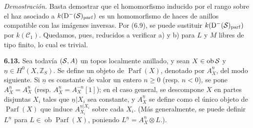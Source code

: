 \providecommand{\Cpx}{\mathrm C}
\providecommand{\Kpx}{\mathrm K}
\providecommand{\Dpx}{\mathrm D}
\providecommand{\Ho}{\mathrm H}
\providecommand{\RHom}{\mathrm R\!\operatorname{Hom}}
\providecommand{\Ob}{\operatorname{ob}}
\providecommand{\Hom}{\operatorname{Hom}}
\providecommand{\RHom}{\mathrm R\!\operatorname{Hom}}
\providecommand{\Ext}{\operatorname{Ext}}
\providecommand{\Tor}{\operatorname{Tor}}
\providecommand{\Tr}{\operatorname{Tr}}
\providecommand{\Add}{\operatorname{Add}}
\providecommand{\Cart}{\operatorname{Cart}}
\providecommand{\Parf}{\operatorname{Parf}}
\providecommand{\coh}{\operatorname{coh}}
\providecommand{\amp}{\operatorname{amp}}
\providecommand{\cl}{\operatorname{cl}}
\providecommand{\rg}{\operatorname{rg}}
\providecommand{\Id}{\operatorname{Id}}
\providecommand{\Ker}{\operatorname{Ker}}
\providecommand{\Im}{\operatorname{Im}}
\providecommand{\cH}{\mathcal H}
\providecommand{\Zs}{\mathbb Z_S}
\providecommand{\A}{\mathcal A}
\providecommand{\cC}{\mathcal C}
\providecommand{\cCzero}{\mathcal C_0}
\providecommand{\otL}{\mathop{\otimes}^{\mathrm L}}
\providecommand{\tamp}{\operatorname{tor.amp}}
\providecommand{\pamp}{\operatorname{parf.amp}}
\providecommand{\pdim}{\operatorname{parf.dim}}
\providecommand{\bon}{\mathrm b}
\providecommand{\parf}{\operatorname{parf}}
\providecommand{\parff}{\operatorname{parf}}
\providecommand{\ac}{\mathrm{ac}}


\providecommand{\End}{\operatorname{End}}
\providecommand{\tr}{\operatorname{tr}}

\emph{Demostración.} Basta demostrar que el homomorfismo inducido por el rango sobre el haz asociado a \(k(\Dpx^-(\sisi{S}{\mathcal S})_{\mathrm{parf}})\) es un homomorfismo de haces de anillos compatible con las imágenes inversas. Por (6.9), se puede sustituir \(k(\Dpx^-(\sisi{S}{\mathcal S})_{\mathrm{parf}})\) por \(k(\mathcal C_1)\). Quedamos, pues, reducidos a verificar a) y b) para \(L\) y \(M\) libres de tipo finito, lo cual es trivial.

\textbf{6.13.} Sea todavía \((\sisi{S}{\mathcal S},A)\) un topos localmente anillado, y sean \(X\in\Ob \sisi{S}{\mathcal S}\) y \(\underline n\in H^0(X,\mathbb Z_S)\). Se define un objeto de \(\Parf(X)\), denotado por \(A_X^{\underline n}\), del modo siguiente. Si \(\underline n\) es constante de valor un entero \(n\geq0\) (resp. \(n<0\)), se pone \(A_X^{\underline n}=A_X^n\) (resp. \(A_X^{\underline n}=A_X^{-n}[1]\)); en el caso general, se descompone \(X\) en partes disjuntas \(X_i\) tales que \(\underline n|X_i\) sea constante, y \(A_X^{\underline n}\) se define como el único objeto de \(\Parf(X)\) que induce \(A_{X_i}^{\underline n|X_i}\) sobre cada \(X_i\). (Más generalmente, se puede definir \(L^{\underline n}\) para \(L\in\Ob\Parf(X)\), poniendo \(L^{\underline n}=A_X^{\underline n}\otimes L\).).

